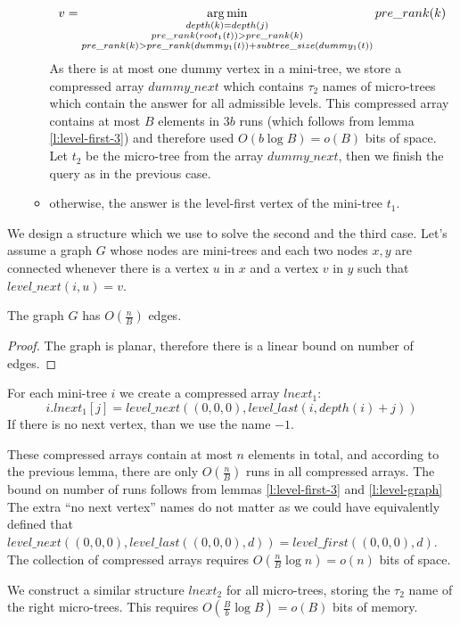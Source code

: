 \begin{itemize}
\begin{itemize}
		$$ v = \operatorname*{arg\,min}_{\substack{depth(k) = depth(j) \\ pre\_rank(root_1(t))> pre\_rank(k) \\ pre\_rank(k) > pre\_rank(dummy_1(t)) + subtree\_size(dummy_1(t))}} pre\_rank(k)$$
		As there is at most one dummy vertex in a mini-tree, we store a compressed array $dummy\_next$ which contains $\tau_2$ names of micro-trees which contain the answer for all admissible levels.
		This compressed array contains at most $B$ elements in $3b$ runs (which follows from lemma \ref{l:level-first-3}) and therefore used $O(b \log B) = o(B)$ bits of space.
		Let $t_2$ be the micro-tree from the array $dummy\_next$, then we finish the query as in the previous case.
		\item otherwise, the answer is the level-first vertex of the mini-tree $t_1$.
	\end{itemize}
\end{itemize}

We design a structure which we use to solve the second and the third case.
Let's assume a graph $G$ whose nodes are mini-trees and each two nodes $x, y$ are connected whenever there is a vertex $u$ in $x$ and a vertex $v$ in $y$ such that $level\_next(i, u) = v$.

\begin{lemma}\label{l:level-graph}
	The graph $G$ has $O(\frac{n}{B})$ edges.
\end{lemma}
\begin{proof}
	The graph is planar, therefore there is a linear bound on number of edges.
\end{proof}

For each mini-tree $i$ we create a compressed array $lnext_1$:
$$i.lnext_1[j] = level\_next((0, 0, 0), level\_last(i, depth(i) + j))$$
If there is no next vertex, than we use the name $-1$.

These compressed arrays contain at most $n$ elements in total, and according to the previous lemma, there are only $O(\frac{n}{B})$ runs in all compressed arrays.
The bound on number of runs follows from lemmas \ref{l:level-first-3} and \ref{l:level-graph}
The extra ``no next vertex'' names do not matter as we could have equivalently defined that $level\_next((0, 0, 0), level\_last((0, 0, 0), d)) = level\_first((0, 0, 0), d)$.
The collection of compressed arrays requires $O(\frac{n}{B} \log n) = o(n)$ bits of space.

We construct a similar structure $lnext_2$ for all micro-trees, storing the $\tau_2$ name of the right micro-trees.
This requires $O(\frac{B}{b} \log B) = o(B)$ bits of memory.

